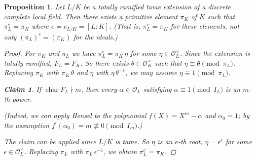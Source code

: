 \documentclass{article}
\DeclareMathOperator{\fchar}{char}
\theoremstyle{myplain}
\newtheorem{proposition}{Proposition}[section]
\newtheorem*{claim}{Claim}
\theoremstyle{mydefinition}
\begin{document}
\begin{proposition}
  Let $L/K$ be a totally ramified tame extension of a discrete complete local
  field. Then there exists a primitive element $\pi_K$ of $K$ such that
  $\pi_L^e = \pi_K$ where $e = e_{L/K} = [L:K]$. (That is, $\pi_L^e = \pi_K$ for
  these elements, not only $(\pi_L)^e = (\pi_K)$ for the ideals.)

  \begin{proof}
    For $\pi_K$ and $\pi_L$ we have $\pi_L^e = \pi_K \, \eta$ for some
    $\eta \in \mathcal{O}_L^\times$. Since the extension is totally ramified,
    $F_L = F_K$. So there exists $\theta \in \mathcal{O}_K^\times$ such that
    $\eta \equiv \theta \pmod{\pi_L}$. Replacing $\pi_K$ with $\pi_K\,\theta$
    and $\eta$ with $\eta\,\theta^{-1}$, we may assume
    $\eta \equiv 1 \pmod{\pi_L}$.

    \begin{claim}
      If $\fchar F_L \nmid m$, then every $\alpha \in \mathcal{O}_L$ satisfying
      $\alpha \equiv 1 \pmod{I_L}$ is an $m$-th power.
    \end{claim}

    \noindent (Indeed, we can apply Hensel to the polynomial
    $f (X) = X^m - \alpha$ and $\alpha_0 = 1$; by the assumption
    $f^\prime (\alpha_0) = m \not\equiv 0 \pmod{I_m}$.)

    \vspace{1em}

    The claim can be applied since $L/K$ is tame. So $\eta$ is an $e$-th root,
    $\eta = \epsilon^e$ for some $\epsilon \in \mathcal{O}_L^\times$. Replacing $\pi_L$
    with $\pi_L\,\epsilon^{-1}$, we obtain $\pi_L^e = \pi_K$.
  \end{proof}
\end{proposition}
\end{document}

